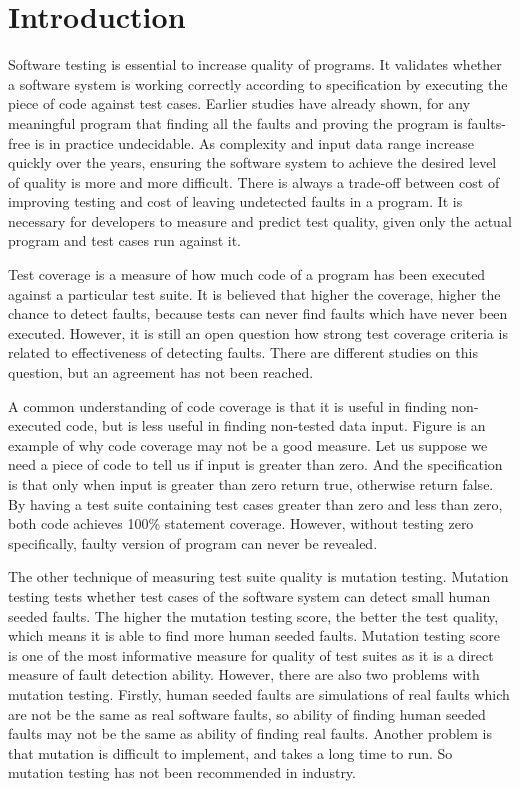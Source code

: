 \section{Introduction}
Software testing is essential to increase quality of programs. It validates whether a software system is working correctly according to specification by executing the piece of code against test cases. Earlier studies have already shown, for any meaningful program that finding all the faults and proving the program is faults-free is in practice undecidable. As complexity and input data range increase quickly over the years, ensuring the software system to achieve the desired level of quality is more and more difficult. There is always a trade-off between cost of improving testing and cost of leaving undetected faults in a program. It is necessary for developers to measure and predict test quality, given only the actual program and test cases run against it.

Test coverage is a measure of how much code of a program has been executed against a particular test suite. It is believed that higher the coverage, higher the chance to detect faults, because tests can never find faults which have never been executed. However, it is still an open question how strong test coverage criteria is related to effectiveness of detecting faults. There are different studies on this question, but an agreement has not been reached.

A common understanding of code coverage is that it is useful in finding non-executed code, but is less useful in finding non-tested data input. Figure is an example of why code coverage may not be a good measure. Let us suppose we need a piece of code to tell us if input is greater than zero. And the specification is that only when input is greater than zero return true, otherwise return false. By having a test suite containing test cases greater than zero and less than zero, both code achieves 100\% statement coverage. However, without testing zero specifically, faulty version of program can never be revealed.

The other technique of measuring test suite quality is mutation testing. Mutation testing tests whether test cases of the software system can detect small human seeded faults. The higher the mutation testing score, the better the test quality, which means it is able to find more human seeded faults. Mutation testing score is one of the most informative measure for quality of test suites as it is a direct measure of fault detection ability. However, there are also two problems with mutation testing. Firstly, human seeded faults are simulations of real faults which are not be the same as real software faults, so ability of finding human seeded faults may not be the same as ability of finding real faults. Another problem is that mutation is difficult to implement, and takes a long time to run. So mutation testing has not been recommended in industry. 

